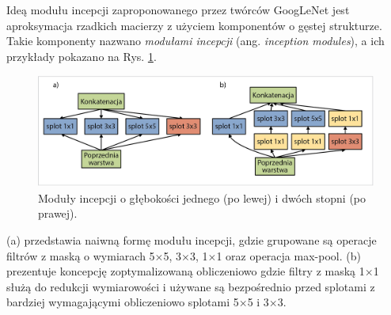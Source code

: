 Ideą modułu incepcji zaproponowanego przez twórców GoogLeNet jest aproksymacja rzadkich macierzy z użyciem komponentów o gęstej strukturze. Takie komponenty nazwano \textit{modułami incepcji} (ang. \textit{inception modules}), a ich przykłady pokazano na Rys. \ref{GoogleNetInceptionModules}. 
\begin{figure}[h!]
	\centering
	\includegraphics[width=1\textwidth]{figures/InceptionModules.png}
	\caption{Moduły incepcji o głębokości jednego (po lewej) i dwóch stopni (po prawej).}
	\label{GoogleNetInceptionModules}
\end{figure}

(a) przedstawia naiwną formę modułu incepcji, gdzie grupowane są operacje filtrów z maską o wymiarach 5$\times$5, 3$\times$3, 1$\times$1 oraz operacja max-pool. (b) prezentuje koncepcję zoptymalizowaną obliczeniowo gdzie filtry z maską 1$\times$1 służą do redukcji wymiarowości i używane są bezpośrednio przed splotami z bardziej wymagającymi obliczeniowo splotami 5$\times$5 i 3$\times$3. 

